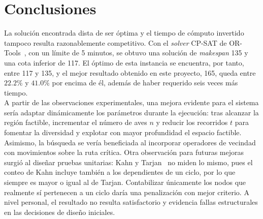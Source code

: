 \documentclass[9pt,a4paper,twocolumn,twoside]{rho-class/rho}
\begin{document}
\section{Conclusiones}
La solución encontrada dista de ser óptima y el tiempo de cómputo invertido tampoco resulta razonablemente competitivo. Con el \textit{solver} CP-SAT de
OR-Tools~\cite{ortools}, con un límite de 5 minutos, se obtuvo una solución de \textit{makespan} 135 y una cota inferior de 117. El óptimo de esta instancia se encuentra,
por tanto, entre 117 y 135, y el mejor resultado obtenido en este proyecto, 165, queda entre $22.2\%$ y $41.0\%$ por encima de él, además de haber requerido
seis veces más tiempo.\\

A partir de las observaciones experimentales, una mejora evidente para el sistema sería adaptar dinámicamente los parámetros durante la ejecución: tras alcanzar
la región factible, incrementar el número de aves $n$ y reducir los recorridos $t$ para fomentar la diversidad y explotar con mayor profundidad el espacio factible.
Asimismo, la búsqueda se vería beneficiada al incorporar operadores de vecindad con movimientos sobre la ruta crítica. Otra observación para futuras mejoras
surgió al diseñar pruebas unitarias: Kahn y Tarjan~\cite{tarjan1972} no miden lo mismo, pues el conteo de Kahn incluye también a los dependientes de un ciclo,
por lo que siempre es mayor o igual al de Tarjan. Contabilizar únicamente los nodos que realmente sí pertenecen a un ciclo daría una penalización con mejor criterio. 
A nivel personal, el resultado no resulta satisfactorio y evidencia fallas estructurales en las decisiones de diseño iniciales. %

\printbibliography
\end{document}
